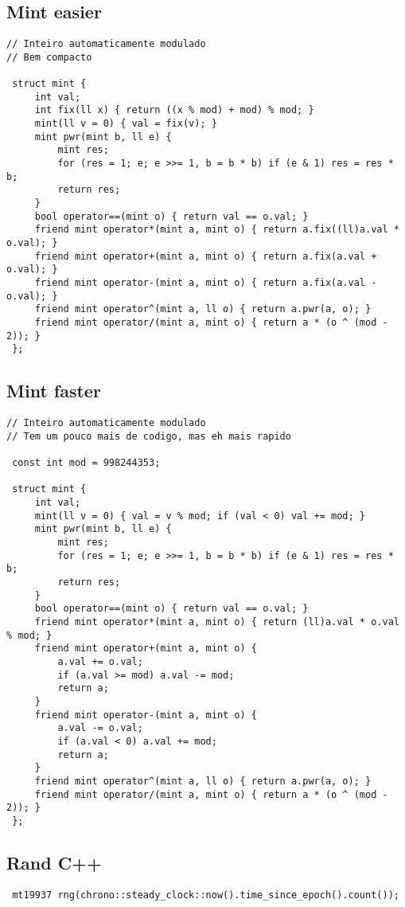\documentclass[11pt, a4paper, twoside]{article}
\begin{document}
\subsection{Mint easier}
\begin{lstlisting}
// Inteiro automaticamente modulado
// Bem compacto

 struct mint {
     int val;
     int fix(ll x) { return ((x % mod) + mod) % mod; }
     mint(ll v = 0) { val = fix(v); }
     mint pwr(mint b, ll e) {
         mint res;
         for (res = 1; e; e >>= 1, b = b * b) if (e & 1) res = res * b;
         return res;
     }
     bool operator==(mint o) { return val == o.val; }
     friend mint operator*(mint a, mint o) { return a.fix((ll)a.val * o.val); }
     friend mint operator+(mint a, mint o) { return a.fix(a.val + o.val); }
     friend mint operator-(mint a, mint o) { return a.fix(a.val - o.val); }
     friend mint operator^(mint a, ll o) { return a.pwr(a, o); }
     friend mint operator/(mint a, mint o) { return a * (o ^ (mod - 2)); }
 };
\end{lstlisting}

\subsection{Mint faster}
\begin{lstlisting}
// Inteiro automaticamente modulado
// Tem um pouco mais de codigo, mas eh mais rapido

 const int mod = 998244353;
 
 struct mint {
     int val;
     mint(ll v = 0) { val = v % mod; if (val < 0) val += mod; }
     mint pwr(mint b, ll e) {
         mint res;
         for (res = 1; e; e >>= 1, b = b * b) if (e & 1) res = res * b;
         return res;
     }
     bool operator==(mint o) { return val == o.val; }
     friend mint operator*(mint a, mint o) { return (ll)a.val * o.val % mod; }
     friend mint operator+(mint a, mint o) {
         a.val += o.val;
         if (a.val >= mod) a.val -= mod;
         return a;
     }
     friend mint operator-(mint a, mint o) {
         a.val -= o.val;
         if (a.val < 0) a.val += mod;
         return a;
     }
     friend mint operator^(mint a, ll o) { return a.pwr(a, o); }
     friend mint operator/(mint a, mint o) { return a * (o ^ (mod - 2)); }
 };
\end{lstlisting}

\subsection{Rand C++}
\begin{lstlisting}
 mt19937 rng(chrono::steady_clock::now().time_since_epoch().count());
\end{lstlisting}
\end{document}
